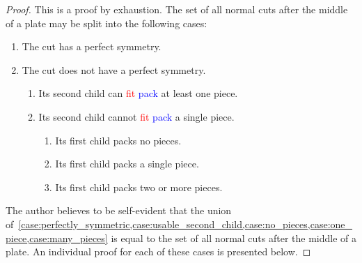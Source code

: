 \documentclass[ppgc,tese,english,formais,babel]{iiufrgs}
\newif\iffinalversion
\newcommand{\newtext}[1]{\iffinalversion%
#1%
\else%
\textcolor{blue}{#1}%
\fi%
}
\newcommand{\oldtext}[1]{\iffinalversion%
\else%
\textcolor{red}{#1}%
\fi%
}
\begin{document}
\begin{proof} This is a proof by exhaustion. The set of all normal cuts after the middle of a plate may be split into the following cases:
\begin{enumerate}
  \item The cut has a perfect symmetry. \label{case:perfectly_symmetric}
  \item The cut does not have a perfect symmetry.
  \begin{enumerate}
    \item Its second child can \oldtext{fit}\newtext{pack} at least one piece. \label{case:usable_second_child}
    \item Its second child cannot \oldtext{fit}\newtext{pack} a single piece.
    \begin{enumerate}
      \item Its first child packs no pieces. \label{case:no_pieces}
      \item Its first child packs a single piece. \label{case:one_piece} %
      \item Its first child packs two or more pieces. \label{case:many_pieces}
    \end{enumerate}
  \end{enumerate}
\end{enumerate}

The author believes to be self-evident that the union of~\cref{case:perfectly_symmetric,case:usable_second_child,case:no_pieces,case:one_piece,case:many_pieces} is equal to the set of all normal cuts after the middle of a plate. An individual proof for each of these cases is presented below.


\end{proof}
\end{document}
